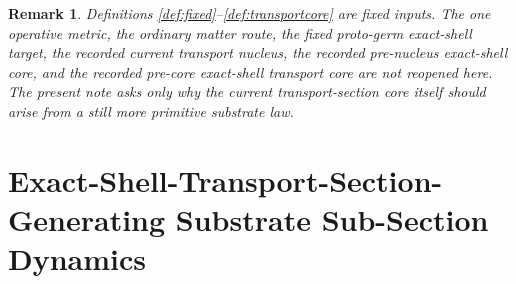 \documentclass[11pt]{article}
\newtheorem{remark}{Remark}
\begin{document}
\begin{remark}
Definitions \ref{def:fixed}--\ref{def:transportcore} are fixed inputs. The one operative metric, the ordinary matter route, the fixed proto-germ exact-shell target, the recorded current transport nucleus, the recorded pre-nucleus exact-shell core, and the recorded pre-core exact-shell transport core are not reopened here. The present note asks only why the current transport-section core itself should arise from a still more primitive substrate law.
\end{remark}

\section{Exact-Shell-Transport-Section-Generating Substrate Sub-Section Dynamics}
\end{document}
